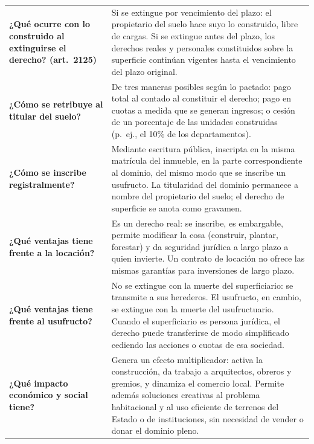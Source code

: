 \documentclass[12pt,oneside]{book}
\begin{document}
\begin{table}[H]
\begin{tabularx}{\textwidth}{
    >{\raggedright\arraybackslash}p{}
    >{\raggedright\arraybackslash}X
}
\textbf{¿Qué ocurre con lo construido al extinguirse el derecho? (art.~2125)} &
Si se extingue por vencimiento del plazo: el propietario del suelo hace suyo lo construido, libre de cargas. Si se extingue antes del plazo, los derechos reales y personales constituidos sobre la superficie continúan vigentes hasta el vencimiento del plazo original. \\
\addlinespace

\textbf{¿Cómo se retribuye al titular del suelo?} &
De tres maneras posibles según lo pactado: pago total al contado al constituir el derecho; pago en cuotas a medida que se generan ingresos; o cesión de un porcentaje de las unidades construidas (p.~ej., el 10\% de los departamentos). \\
\addlinespace

\textbf{¿Cómo se inscribe registralmente?} &
Mediante escritura pública, inscripta en la misma matrícula del inmueble, en la parte correspondiente al dominio, del mismo modo que se inscribe un usufructo. La titularidad del dominio permanece a nombre del propietario del suelo; el derecho de superficie se anota como gravamen. \\
\addlinespace

\textbf{¿Qué ventajas tiene frente a la locación?} &
Es un derecho real: se inscribe, es embargable, permite modificar la cosa (construir, plantar, forestar) y da seguridad jurídica a largo plazo a quien invierte. Un contrato de locación no ofrece las mismas garantías para inversiones de largo plazo. \\
\addlinespace

\textbf{¿Qué ventajas tiene frente al usufructo?} &
No se extingue con la muerte del superficiario: se transmite a sus herederos. El usufructo, en cambio, se extingue con la muerte del usufructuario. Cuando el superficiario es persona jurídica, el derecho puede transferirse de modo simplificado cediendo las acciones o cuotas de esa sociedad. \\
\addlinespace

\textbf{¿Qué impacto económico y social tiene?} &
Genera un efecto multiplicador: activa la construcción, da trabajo a arquitectos, obreros y gremios, y dinamiza el comercio local. Permite además soluciones creativas al problema habitacional y al uso eficiente de terrenos del Estado o de instituciones, sin necesidad de vender o donar el dominio pleno. \\

\midrule


\end{tabularx}
\end{table}
\end{document}
